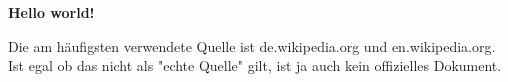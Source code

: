 \documentclass[../document.tex]{subfiles}
\begin{document}
\textbf{Hello world!}

Die am häufigsten verwendete Quelle ist de.wikipedia.org und en.wikipedia.org. Ist egal ob das nicht als "echte Quelle" gilt, ist ja auch kein offizielles Dokument. 
\end{document}
